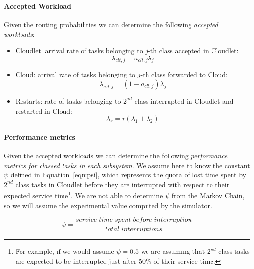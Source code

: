 \paragraph{Accepted Workload}
Given the routing probabilities we can determine the following \textit{accepted workloads}:

\begin{itemize}
	\item Cloudlet: arrival rate of tasks belonging to $j$-th class accepted in Cloudlet:
	\begin{equation}
	\lambda_{clt,j} = a_{clt,j}\lambda_{j}
	\end{equation}
	
	\item Cloud: arrival rate of tasks belonging to $j$-th class forwarded to Cloud:
	\begin{equation}
	\lambda_{cld,j} = (1-a_{clt,j})\lambda_{j}
	\end{equation}
	
	\item Restarts: rate of tasks belonging to $2^{nd}$ class interrupted in Cloudlet and restarted in Cloud:
	\begin{equation}
	\lambda_{r} = r(\lambda_{1}+\lambda_{2})
	\end{equation}
\end{itemize}

\paragraph{Performance metrics}
Given the accepted workloads we can determine the following \textit{performance metrics for classed tasks in each subsystem}.
%
We assume here to know the constant $\psi$ defined in Equation~\ref{eqn:psi}, which represents the quota of lost time spent by $2^{nd}$ class tasks in Cloudlet before they are interrupted with respect to their expected service time\footnote{For example, if we would assume $\psi=0.5$ we are assuming that $2^{nd}$ class tasks are expected to be interrupted just after $50\%$ of their service time.}.
%
We are not able to determine $\psi$ from the Markov Chain, so we will assume the experimental value computed by the simulator. 

\begin{equation} 
\psi = \frac{service\;time\;spent\;before\;interruption}{total\;interruptions}
\label{eqn:psi}
\end{equation}

